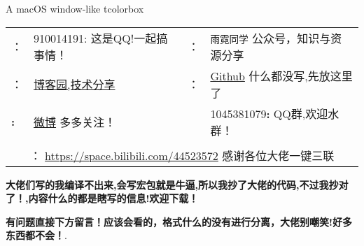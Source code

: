 \documentclass{article}
\begin{document}
\begin{macboxd}[coltext=white]{A macOS window-like tcolorbox}
\begin{tabular}{@{}l@{ }l|l@{ }l@{}}
		\textcolor[RGB]{18,183,245}{\faQq}：&910014191:  这是QQ!一起搞事情！\faSendO   & \textcolor[RGB]{9,187,7}{\faWeixin}：&\verb|雨霓同学|  公众号，知识与资源分享\faSendO \\
		\textcolor[RGB]{0,194,255}{\faInternetExplorer}：& \href{https://www.cnblogs.com/1210x1184/}{ 博客园,技术分享}  & {\textcolor[RGB]{39,165,188}{\faGithubAlt}}：& \href{https://github.com/Azure1210/}{Github}  什么都没写,先放这里了 \\
		\textcolor[RGB]{236, 29, 152}{\faWeibo}\textbf{:} & \href{https://weibo.com/u/5713129191}{微博} \faSendO 多多关注！ &\textcolor[RGB]{255, 148, 209}{\faUsers} &1045381079\textbf{:}  QQ群,欢迎水群！\faSendO \\[2pt]\\
		\multicolumn{4}{c}{\textcolor[RGB]{252,74,35}{\faTv}： \url{https://space.bilibili.com/44523572} \faSendO 感谢各位大佬一键三联\faSendO}\\
	\end{tabular}
\end{macboxd}	
	
\textbf{大佬们写的我编译不出来,会写宏包就是牛逼,所以我抄了大佬的代码,不过我抄对了！,内容什么的都是瞎写的信息!欢迎下载！}

\textbf{有问题直接下方留言！应该会看的，格式什么的没有进行分离，大佬别嘲笑!好多东西都不会！}.
	
	
\end{document}
